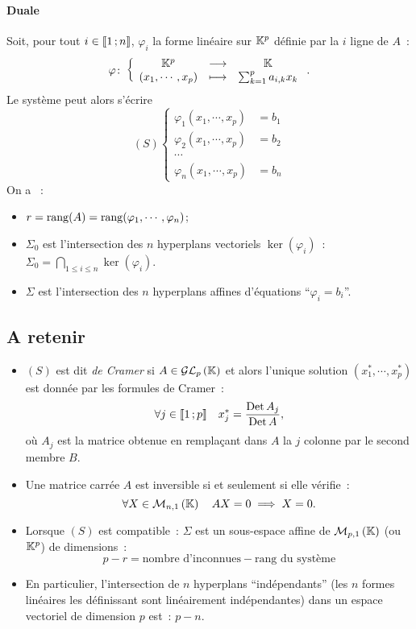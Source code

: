 \paragraph{Duale} Soit, pour tout $i \in \mathopen{\llbracket}1\mathclose{}\mathpunct{};n\mathclose{\rrbracket}$, $\varphi_i$ la forme linéaire sur $\mathbb{K}^p$ définie par la $i$\ieme{} ligne de $A$~:
\begin{equation}
	\varphi\colon \left\{\begin{array}{ccc} \mathbb{K}^p & \longrightarrow &\mathbb{K}\\ (x_1, \cdots, x_p) & \longmapsto & \sum_{k=1}^p a_{i,k}x_k \end{array} \right..
\end{equation}
Le système peut alors s'écrire
\begin{equation}
	(S) \left\{ \begin{array}{ll}
		\varphi_1(x_1, \cdots, x_p) &= b_1 \\
		\varphi_2(x_1, \cdots, x_p) &= b_2 \\
		 \cdots      &   \\
		\varphi_n(x_1, \cdots, x_p) &= b_n
	\end{array}
	\right.
\end{equation}
On a ~:
\begin{itemize}
	\item $r=\operatorname{rang}(A) = \operatorname{rang}(\varphi_1, \cdots, \varphi_n)$;
	\item $\Sigma_0$ est l'intersection des $n$ hyperplans vectoriels $\ker(\varphi_i)$~: $\Sigma_0 = \bigcap_{1 \leqslant i \leqslant n} \ker(\varphi_i)$.
	\item $\Sigma$ est l'intersection des $n$ hyperplans affines d'équations ``$\varphi_i=b_i$''.
\end{itemize}

\subsection{A retenir}
\begin{itemize}
	\item $(S)$ est dit \emph{de Cramer} si $A \in \mathcal{GL}_{p}\left(\mathbb{K}\right)$ et alors l'unique solution $(x_1^*, \cdots, x_p^*)$ est donnée par les formules de Cramer~:
	\begin{equation}
		\forall j \in \mathopen{\llbracket}1\mathclose{}\mathpunct{};p\mathclose{\rrbracket} \quad x_j^* = \frac{\operatorname{Det} A_j}{\operatorname{Det} A},
	\end{equation}
	où $A_j$ est la matrice obtenue en remplaçant dans $A$ la $j$\ieme{} colonne par le second membre $B$.
	\item Une matrice carrée $A$ est inversible si et seulement si elle vérifie~:
	\begin{equation}
		\forall X \in \mathcal{M}_{n,1}\left(\mathbb{K}\right) \quad AX=0 \implies X=0.
	\end{equation}
	\item Lorsque $(S)$ est compatible~: $\Sigma$ est un sous-espace affine de $\mathcal{M}_{p,1}\left(\mathbb{K}\right)$ (ou $\mathbb{K}^p$) de dimensions~:
	\begin{equation}
		p-r = \text{nombre d'inconnues} - \text{rang du système}
	\end{equation}
	\item En particulier, l'intersection de $n$ hyperplans ``indépendants'' (les $n$ formes linéaires les définissant sont linéairement indépendantes) dans un espace vectoriel de dimension $p$ est~: $p-n$.
\end{itemize}